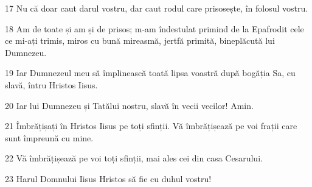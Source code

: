 \par 17 Nu că doar caut darul vostru, dar caut rodul care prisosește, în folosul vostru.
\par 18 Am de toate și am și de prisos; m-am îndestulat primind de la Epafrodit cele ce mi-ați trimis, miros cu bună mireasmă, jertfă primită, bineplăcută lui Dumnezeu.
\par 19 Iar Dumnezeul meu să împlinească toată lipsa voastră după bogăția Sa, cu slavă, întru Hristos Iisus.
\par 20 Iar lui Dumnezeu și Tatălui nostru, slavă în vecii vecilor! Amin.
\par 21 Îmbrățișați în Hristos Iisus pe toți sfinții. Vă îmbrățișează pe voi frații care sunt împreună cu mine.
\par 22 Vă îmbrățișează pe voi toți sfinții, mai ales cei din casa Cesarului.
\par 23 Harul Domnului Iisus Hristos să fie cu duhul vostru!


